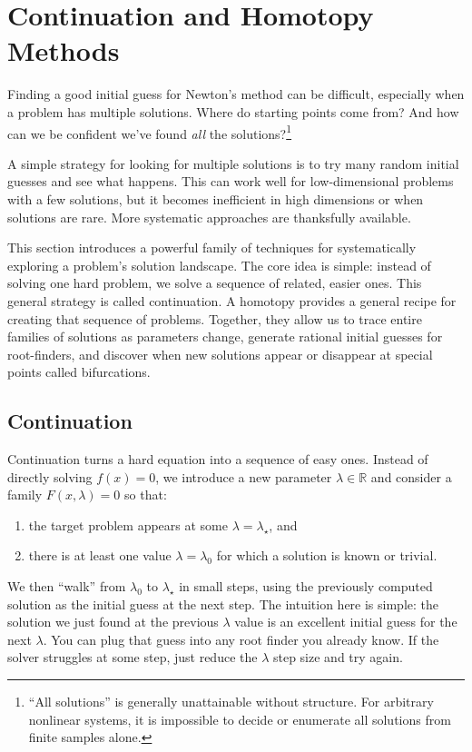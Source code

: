 \section{Continuation and Homotopy Methods}

Finding a good initial guess for Newton's method can be difficult, especially when a problem has multiple solutions. Where do starting points come from? And how can we be confident we've found \emph{all} the solutions?\footnote{``All solutions'' is generally unattainable without structure. For arbitrary nonlinear systems, it is impossible to decide or enumerate all solutions from finite samples alone.}  

A simple strategy for looking for multiple solutions is to try many random initial guesses and see what happens. This can work well for low-dimensional problems with a few solutions, but it becomes inefficient in high dimensions or when solutions are rare. More systematic approaches are thanksfully available.

This section introduces a powerful family of techniques for systematically exploring a problem's solution landscape. The core idea is simple: instead of solving one hard problem, we solve a sequence of related, easier ones. This general strategy is called continuation. A homotopy provides a general recipe for creating that sequence of problems. Together, they allow us to trace entire families of solutions as parameters change, generate rational initial guesses for root-finders, and discover when new solutions appear or disappear at special points called bifurcations.

\subsection{Continuation}

Continuation turns a hard equation into a sequence of easy ones. Instead of directly solving $f(x)=0$, we introduce a new parameter $\lambda \in \mathbb{R}$ and consider a family $F(x,\lambda)=0$ so that:

\begin{enumerate}
\item the target problem appears at some $\lambda=\lambda_\star$, and
\item there is at least one value $\lambda=\lambda_0$ for which a solution is known or trivial.
\end{enumerate}

We then ``walk'' from $\lambda_0$ to $\lambda_\star$ in small steps, using the previously computed solution as the initial guess at the next step. The intuition here is simple: the solution we just found at the previous $\lambda$ value is an excellent initial guess for the next $\lambda$. You can plug that guess into any root finder you already know. If the solver struggles at some step, just reduce the $\lambda$ step size and try again.


